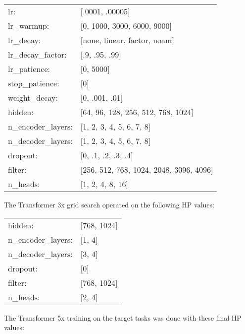 \begin{tabular}{ll}
lr: & [.0001, .00005] \\
lr\_warmup: & [0, 1000, 3000, 6000, 9000] \\
lr\_decay: & [none, linear, factor, noam] \\
lr\_decay\_factor: & [.9, .95, .99] \\
lr\_patience: & [0, 5000] \\
stop\_patience: & [0] \\
weight\_decay: & [0, .001, .01] \\
hidden: & [64, 96, 128, 256, 512, 768, 1024] \\
n\_encoder\_layers: & [1, 2, 3, 4, 5, 6, 7, 8] \\
n\_decoder\_layers: & [1, 2, 3, 4, 5, 6, 7, 8] \\
dropout: & [0, .1, .2, .3, .4] \\
filter: & [256, 512, 768, 1024, 2048, 3096, 4096] \\
n\_heads: & [1, 2, 4, 8, 16] \\     
\end{tabular}

\vskip 0.15in
The Transformer 3x grid search operated on the following HP values: 

\begin{tabular}{ll}
    hidden: & [768, 1024] \\
    n\_encoder\_layers: & [1, 4] \\
    n\_decoder\_layers: & [3, 4] \\
    dropout: & [0] \\
    filter: & [768, 1024] \\
    n\_heads: & [2, 4] \\   
\end{tabular}
\vskip 0.15in

The Transformer 5x training on the target tasks was done with these final HP values:

